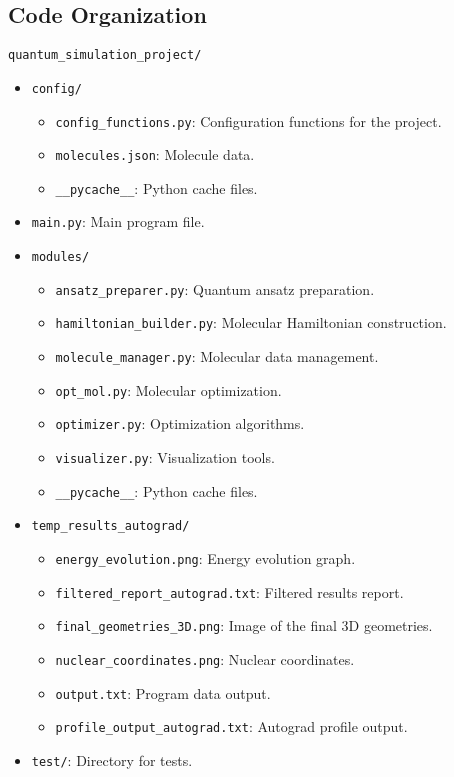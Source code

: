 \subsection{Code Organization}
\begin{ProjectStructure}
  \texttt{quantum\_simulation\_project/}
  \begin{itemize}[label={}, left=1em]
      \item \texttt{config/}
      \begin{itemize}[label={}, left=2em]
          \item \texttt{config\_functions.py}: Configuration functions for the project.
          \item \texttt{molecules.json}: Molecule data.
          \item \texttt{\_\_pycache\_\_}: Python cache files.
      \end{itemize}
      \item \texttt{main.py}: Main program file.
      \item \texttt{modules/}
      \begin{itemize}[label={}, left=2em]
          \item \texttt{ansatz\_preparer.py}: Quantum ansatz preparation.
          \item \texttt{hamiltonian\_builder.py}: Molecular Hamiltonian construction.
          \item \texttt{molecule\_manager.py}: Molecular data management.
          \item \texttt{opt\_mol.py}: Molecular optimization.
          \item \texttt{optimizer.py}: Optimization algorithms.
          \item \texttt{visualizer.py}: Visualization tools.
          \item \texttt{\_\_pycache\_\_}: Python cache files.
      \end{itemize}
      \item \texttt{temp\_results\_autograd/}
      \begin{itemize}[label={}, left=2em]
          \item \texttt{energy\_evolution.png}: Energy evolution graph.
          \item \texttt{filtered\_report\_autograd.txt}: Filtered results report.
          \item \texttt{final\_geometries\_3D.png}: Image of the final 3D geometries.
          \item \texttt{nuclear\_coordinates.png}: Nuclear coordinates.
          \item \texttt{output.txt}: Program data output.
          \item \texttt{profile\_output\_autograd.txt}: Autograd profile output.
      \end{itemize}
      \item \texttt{test/}: Directory for tests.
  \end{itemize}
\end{ProjectStructure}

